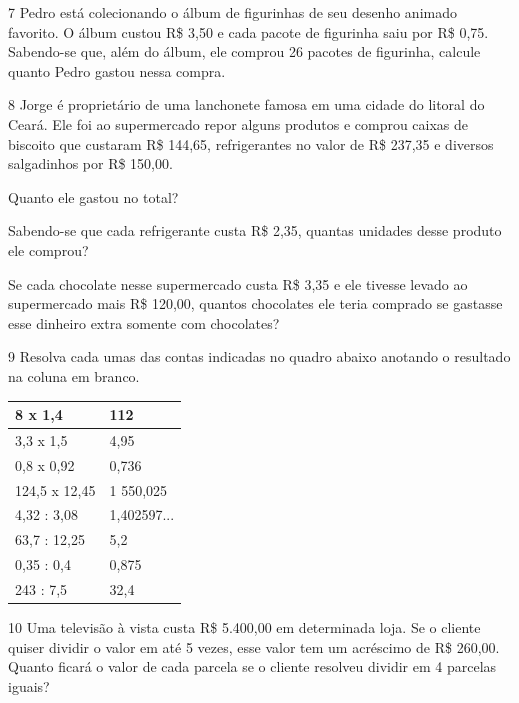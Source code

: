 \num{7} Pedro está colecionando o álbum de figurinhas de seu desenho
animado favorito. O álbum custou R\$ 3,50 e cada pacote de figurinha
saiu por R\$ 0,75. Sabendo-se que, além do álbum, ele comprou 26 pacotes
de figurinha, calcule quanto Pedro gastou nessa compra.

\bigskip
\bigskip
\bigskip

\pagebreak
\num{8} Jorge é proprietário de uma lanchonete famosa em uma cidade do
litoral do Ceará. Ele foi ao supermercado repor alguns produtos e
comprou caixas de biscoito que custaram R\$ 144,65, refrigerantes no
valor de R\$ 237,35 e diversos salgadinhos por R\$ 150,00.

\begin{escolha}
\item
  Quanto ele gastou no total?

\bigskip

\item
  Sabendo-se que cada refrigerante custa R\$ 2,35, quantas unidades
  desse produto ele comprou?

\bigskip

\item
  Se cada chocolate nesse supermercado custa R\$ 3,35 e ele tivesse
  levado ao supermercado mais R\$ 120,00, quantos chocolates ele teria
  comprado se gastasse esse dinheiro extra somente com chocolates?

\bigskip
\end{escolha}


\num{9} Resolva cada umas das contas indicadas no quadro abaixo anotando o
resultado na coluna em branco.

\begin{longtable}[]{@{}ll@{}}
\toprule
8 x 1,4 & 112\tabularnewline
\midrule
\endhead
3,3 x 1,5 & 4,95\tabularnewline
0,8 x 0,92 & 0,736\tabularnewline
124,5 x 12,45 & 1 550,025\tabularnewline
4,32 : 3,08 & 1,402597...\tabularnewline
63,7 : 12,25 & 5,2\tabularnewline
0,35 : 0,4 & 0,875\tabularnewline
243 : 7,5 & 32,4\tabularnewline
\bottomrule
\end{longtable}

\num{10} Uma televisão à vista custa R\$ 5.400,00 em determinada loja.
Se o cliente quiser dividir o valor em até 5 vezes, esse valor tem um
acréscimo de R\$ 260,00. Quanto ficará o valor de cada parcela se o
cliente resolveu dividir em 4 parcelas iguais?

